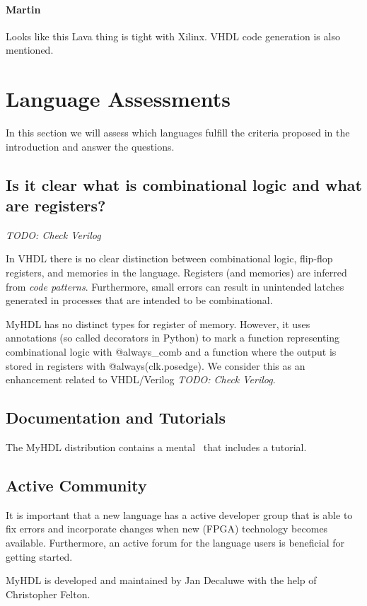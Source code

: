\documentclass[10pt, technote, draftcls, onecolumn]{IEEEtran}
\newcommand{\code}[1]{{\small{\textsf{#1}}}}
\newcommand{\todo}[1]{{\emph{TODO: #1}}}
\newcommand{\comment}[3]{\paragraph*{\textbf{#1}}{\color{#3}#2}}
\newcommand{\martin}[1]{\comment{Martin}{#1}{Blue}}
\begin{document}
\martin{Looks like this Lava thing is tight with Xilinx. VHDL code generation
is also mentioned.}

\section{Language Assessments}

In this section we will assess which languages fulfill the criteria proposed in
the introduction and answer the questions.

\subsection{Is it clear what is combinational logic and what are registers?}

\todo{Check Verilog}

In VHDL there is no clear distinction between combinational logic, flip-flop
registers,  and memories in the language. Registers (and memories) are
inferred from \emph{code patterns}. Furthermore, small errors can result
in unintended latches generated in processes that are intended to be combinational.

MyHDL has no distinct types for register of memory. However, it uses annotations
(so called decorators in Python) to mark a function representing
combinational logic with \code{@always\_comb} and a function where the
output is stored in registers with \code{@always(clk.posedge)}. We consider
this as an enhancement related to VHDL/Verilog \todo{Check Verilog}.

\subsection{Documentation and Tutorials}

The MyHDL distribution contains a mental~\cite{myhdl:2010} that includes
a tutorial.

\subsection{Active Community}

It is important that a new language has a active developer group that is
able to fix errors and incorporate changes when new (FPGA) technology
becomes available. Furthermore, an active forum for the language users
is beneficial for getting started.

MyHDL is developed and maintained by Jan Decaluwe with the help of
Christopher Felton.  
\end{document}
